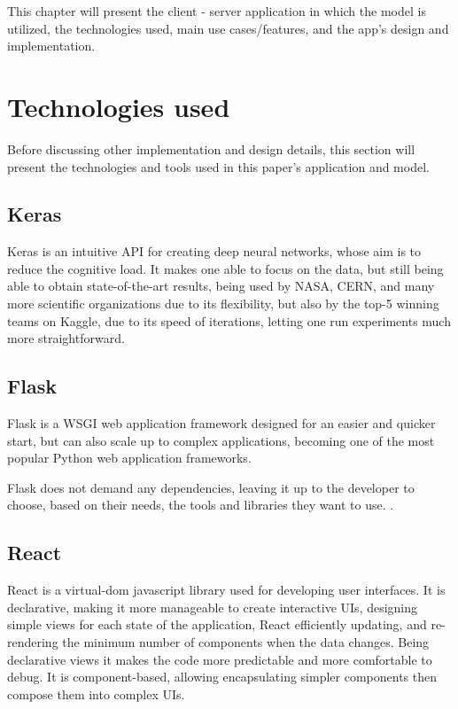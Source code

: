 
This chapter will present the client - server application in which the model is utilized,
the technologies used, main use cases/features,
and the app's design and implementation.


\section{Technologies used}

Before discussing other implementation and design details,
this section will present the technologies and tools used in this paper's
application and model.

\subsection{Keras}
Keras is an intuitive API for creating deep neural networks,
whose aim is to reduce the cognitive load.
It makes one able to focus on the data,
but still being able to obtain state-of-the-art results, being used by NASA,
CERN, and many more scientific organizations due to its flexibility,
but also by the top-5 winning teams on Kaggle, due to its speed of iterations,
letting one run experiments much more straightforward.\cite{keras}

\subsection{Flask}
Flask is a WSGI web application framework designed for an easier and quicker start,
but can also scale up to complex applications,
becoming one of the most popular Python web application frameworks.\cite{flask}

Flask does not demand any dependencies,
leaving it up to the developer to choose,
based on their needs, the tools and libraries they want to use. .\cite{flask}

\subsection{React}
React is a virtual-dom javascript library used for developing user interfaces.
It is declarative, making it more manageable to create interactive UIs,
designing simple views for each state of the application,
React efficiently updating,
and re-rendering the minimum number of components when the data changes.
Being declarative views it makes the code more predictable and more comfortable
to debug.
It is component-based,
allowing encapsulating simpler components then compose them into complex UIs.

